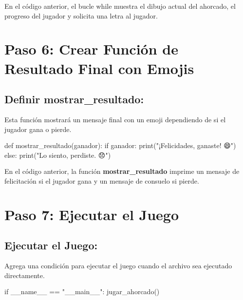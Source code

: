 \documentclass[
  a4paper,
  DIV=11,
  numbers=noendperiod,
  onepage,
  openany]{scrreprt}
\newenvironment{Shaded}{\begin{snugshade}}{\end{snugshade}}
\newcommand{\BuiltInTok}[1]{\textcolor[rgb]{0.00,0.23,0.31}{#1}}
\newcommand{\ControlFlowTok}[1]{\textcolor[rgb]{0.00,0.23,0.31}{#1}}
\newcommand{\KeywordTok}[1]{\textcolor[rgb]{0.00,0.23,0.31}{#1}}
\newcommand{\NormalTok}[1]{\textcolor[rgb]{0.00,0.23,0.31}{#1}}
\newcommand{\OperatorTok}[1]{\textcolor[rgb]{0.37,0.37,0.37}{#1}}
\newcommand{\StringTok}[1]{\textcolor[rgb]{0.13,0.47,0.30}{#1}}
\newcommand{\VariableTok}[1]{\textcolor[rgb]{0.07,0.07,0.07}{#1}}
\begin{document}
En el código anterior, el bucle while muestra el dibujo actual del
ahorcado, el progreso del jugador y solicita una letra al jugador.

\section{Paso 6: Crear Función de Resultado Final con
Emojis}\label{paso-6-crear-funciuxf3n-de-resultado-final-con-emojis}

\subsection{Definir
mostrar\_resultado:}\label{definir-mostrar_resultado}

Esta función mostrará un mensaje final con un emoji dependiendo de si el
jugador gana o pierde.

\begin{Shaded}
\begin{Highlighting}[]
\KeywordTok{def}\NormalTok{ mostrar\_resultado(ganador):}
    \ControlFlowTok{if}\NormalTok{ ganador:}
        \BuiltInTok{print}\NormalTok{(}\StringTok{"¡Felicidades, ganaste! 😄"}\NormalTok{)}
    \ControlFlowTok{else}\NormalTok{:}
        \BuiltInTok{print}\NormalTok{(}\StringTok{"Lo siento, perdiste. 😞"}\NormalTok{)}
\end{Highlighting}
\end{Shaded}

En el código anterior, la función \textbf{mostrar\_resultado} imprime un
mensaje de felicitación si el jugador gana y un mensaje de consuelo si
pierde.

\section{Paso 7: Ejecutar el Juego}\label{paso-7-ejecutar-el-juego}

\subsection{Ejecutar el Juego:}\label{ejecutar-el-juego}

Agrega una condición para ejecutar el juego cuando el archivo sea
ejecutado directamente.

\begin{Shaded}
\begin{Highlighting}[]
\ControlFlowTok{if} \VariableTok{\_\_name\_\_} \OperatorTok{==} \StringTok{"\_\_main\_\_"}\NormalTok{:}
\NormalTok{    jugar\_ahorcado()}
\end{Highlighting}
\end{Shaded}
\end{document}
